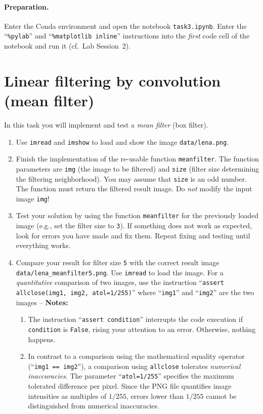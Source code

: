 \documentclass[12pt,a4paper]{article}
\begin{document}
\paragraph{Preparation.} Enter the Conda environment and open the notebook \texttt{task3.ipynb}. Enter the ``\texttt{\%pylab}'' and ``\texttt{\%matplotlib inline}'' instructions into the \emph{first} code cell of the notebook and run it (cf.\ Lab Session~2).

\section{Linear filtering by convolution (mean filter)}
\label{task:boxfilter}
In this task you will implement and test a \emph{mean filter} (box filter).
\begin{enumerate}
    \item Use \texttt{imread} and \texttt{imshow} to load and show the image \texttt{data/lena.png}.
    \item Finish the implementation of the re-usable function \texttt{meanfilter}. The function parameters are \texttt{img} (the image to be filtered) and \texttt{size} (filter size determining the filtering neighborhood). You may assume that \texttt{size} is an odd number. The function must return the filtered result image. Do \emph{not} modify the input image \texttt{img}!
    \item Test your solution by using the function \texttt{meanfilter} for the previously loaded image (e.g., set the filter size to \texttt{3}). If something does not work as expected, look for errors you have made and fix them. Repeat fixing and testing until everything works.
    \item Compare your result for filter size \texttt{5} with the correct result image \texttt{data/lena\_mean\-fil\-ter5.png}. Use \texttt{imread} to load the image. For a \emph{quantitative} comparison of two images, use the instruction ``\texttt{assert allclose(img1, img2, atol=1/255)}'' where ``\texttt{img1}'' and ``\texttt{img2}'' are the two images -- \textbf{Notes:}
    \begin{enumerate}
        \item The instruction ``\texttt{assert condition}'' interrupts the code execution if \texttt{condition} is \texttt{False}, rising your attention to an error. Otherwise, nothing happens.
        \item In contrast to a comparison using the mathematical equality operator (``\texttt{img1 == img2}''), a comparison using \texttt{allclose} tolerates \emph{numerical inaccuracies}. The parameter ``\texttt{atol=1/255}'' specifies the maximum tolerated difference per pixel. Since the PNG file quantifies image intensities as multiples of $1/255$, errors lower than $1/255$ cannot be distinguished from numerical inaccuracies.
    \end{enumerate}
\end{enumerate}
\end{document}
